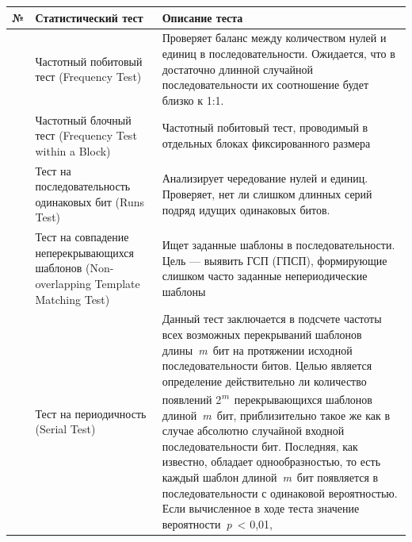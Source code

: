 \clearpage
{}

{\def\LTcaptype{none}%
\begin{longtable}[]{@{}|%
  >{\raggedright\arraybackslash}p{}|%
  >{\raggedright\arraybackslash}p{}|%
  >{\raggedright\arraybackslash}p{}|@{}}
\hline
\begin{minipage}[b]{\hsize}\raggedright
№
\end{minipage} & \begin{minipage}[b]{\hsize}\raggedright
Статистический тест
\end{minipage} & \begin{minipage}[b]{\hsize}\raggedright
Описание теста
\end{minipage} \\ \hline
\endhead
\endlastfoot
1 & Частотный побитовый тест (Frequency Test) & Проверяет баланс между
количеством нулей и единиц в последовательности. Ожидается, что в
достаточно длинной случайной последовательности их соотношение будет
близко к 1:1. \\ \hline
2 & Частотный блочный тест (Frequency Test within a Block) & Частотный
побитовый тест, проводимый в отдельных блоках фиксированного размера \\ \hline
3 & Тест на последовательность одинаковых бит (Runs Test) & Анализирует
чередование нулей и единиц. Проверяет, нет ли слишком длинных серий
подряд идущих одинаковых битов. \\ \hline
4 & Тест на совпадение неперекрывающихся шаблонов (Non-overlapping
Template Matching Test) & Ищет заданные шаблоны в последовательности.
Цель --- выявить ГСП (ГПСП), формирующие слишком часто заданные
непериодические шаблоны \\ \hline
5 & Тест на периодичность (Serial Test) & Данный тест заключается в
подсчете частоты всех возможных перекрываний шаблонов длины~\emph{m}~бит
на протяжении исходной последовательности битов. Целью является
определение действительно ли количество появлений
2\emph{\textsuperscript{m}}~перекрывающихся шаблонов
длиной~\emph{m}~бит, приблизительно такое же как в случае абсолютно
случайной входной последовательности бит. Последняя, как известно,
обладает однообразностью, то есть каждый шаблон длиной~\emph{m}~бит
появляется в последовательности с одинаковой вероятностью. Если
вычисленное в ходе теста значение вероятности~\emph{p}~\textless{} 0,01,

\end{longtable}}
